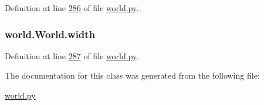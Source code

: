 Definition at line \hyperlink{world_8py_source_l00286}{286} of file \hyperlink{world_8py_source}{world.\+py}.

\hypertarget{classworld_1_1World_a5ace9de2d4cd40bbb013db9712f4ef34}{
\subsubsection[{width}]{\setlength{\rightskip}{0pt plus 5cm}world.\+World.\+width}}\label{classworld_1_1World_a5ace9de2d4cd40bbb013db9712f4ef34}


Definition at line \hyperlink{world_8py_source_l00287}{287} of file \hyperlink{world_8py_source}{world.\+py}.



The documentation for this class was generated from the following file\+:\begin{DoxyCompactItemize}
\item 
\hyperlink{world_8py}{world.\+py}\end{DoxyCompactItemize}
